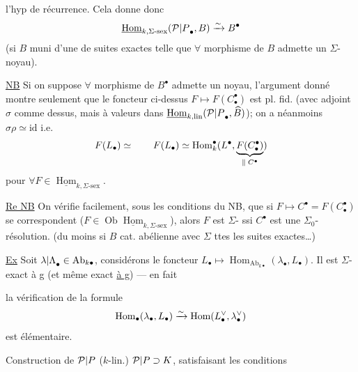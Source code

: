 l'hyp de récurrence. Cela donne donc
\[
\underline{\operatorname{Hom}}_{k,\Sigma\text{-sex}}({\mathcal P|P}_\bullet,B)\xrightarrow{\sim}B^\bullet
\]
(si $B$ muni d'une  de suites exactes
telle que $\forall$ morphisme de $B$ admette
un $\Sigma$-noyau).

\uline{NB} Si on  suppose  
$\forall$ morphisme de $B^\bullet$ admette un noyau,
l'argument donné montre seulement que
le foncteur ci-dessus $F\longmapsto F(C_\bullet^\bullet)$
est pl. fid. (avec adjoint $\sigma$ comme dessus,
mais à valeurs dans $\underline{\operatorname{Hom}}_{k,\mathrm{lin}}({\mathcal P|P}_\bullet,\widehat B)$);
on a néanmoins $\sigma\rho\simeq\mathrm{id}$ i.e.
\[
F(L_\bullet)\simeq\qquad
F(L_\bullet)\simeq\operatorname{Hom}_k^\bullet(L^\bullet,\underbrace{F(C_\bullet^\bullet)}_{\Vert\;C^\bullet})
\]
pour $\forall F\in\underline{\operatorname{Hom}}_{k,\Sigma\text{-sex}}$.

\uline{Re NB} On  vérifie facilement, sous les
conditions du NB, que si $F\longmapsto C^\bullet=F(C_\bullet^\bullet)$
se correspondent ($F\in\operatorname{Ob}\underline{\operatorname{Hom}}_{k,\Sigma\text{-sex}}$), alors
$F$ est $\Sigma$- ssi $C^\bullet$ est une $\Sigma_0$-résolution.
(du moins si $B$ cat. abélienne avec $\Sigma$ ttes
les suites exactes\ldots)

\uline{Ex} Soit ${\lambda|\Lambda}_\bullet\in\mathrm{Ab}_{k\bullet}$, considérons
le foncteur $L_\bullet\longmapsto\operatorname{Hom}_{\mathrm{Ab}_{k\bullet}}(\lambda_\bullet,L_\bullet)$.
Il est $\Sigma$-exact à g (et même exact \uline{à g}) --- en fait

la vérification de la formule
\[
\operatorname{Hom}_{{\bullet}}(\lambda_\bullet,L_\bullet)
\xrightarrow{\sim}\operatorname{Hom}(L_\bullet^\vee,\lambda_\bullet^\vee)
\]
est élémentaire.

Construction  de ${\mathcal P|P}$ ($k$-lin.)
${\mathcal P|P}\supset K$,  satisfaisant les conditions

